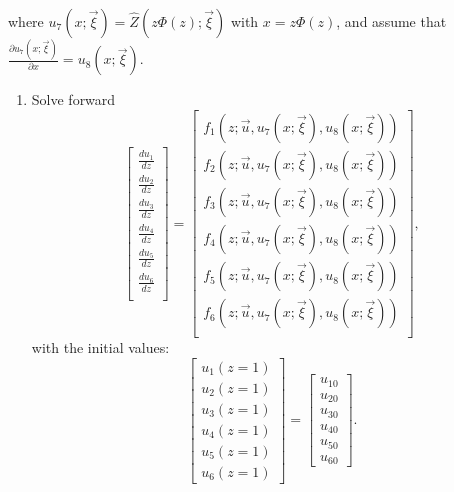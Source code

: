 \documentclass[11pt]{article}
\begin{document}
where ${u_7}\left( {x;\vec \xi  } \right) = \widehat Z\left( {z\Phi \left( z \right);\vec \xi  } \right)$ with $ x = z\Phi \left( z \right)$, and {\color{blue} assume that $ \frac{{\partial {u_7}\left( {x;\vec \xi } \right)}}{{\partial x}} = {u_8}\left( {x;\vec \xi } \right) $}. 

\begin{enumerate}
	\item  Solve forward 
		\begin{equation}
			\begin{bmatrix}
			\frac{{du_1}}{{dz}} \\
			\frac{{du_2}}{{dz}} \\
			\frac{{du_3}}{{dz}} \\
			\frac{{du_4}}{{dz}} \\
			\frac{{du_5}}{{dz}} \\
			\frac{{du_6}}{{dz}} \\
		    \end{bmatrix} = \begin{bmatrix}
				f_1\left( {z;\vec u,{u_7}\left( {x;\vec \xi } \right), {u_8}\left( {x;\vec \xi } \right) }\right)\\
				f_2\left( {z;\vec u,{u_7}\left( {x;\vec \xi } \right), {u_8}\left( {x;\vec \xi } \right) }\right)\\
				f_3\left( {z;\vec u,{u_7}\left( {x;\vec \xi } \right), {u_8}\left( {x;\vec \xi } \right) }\right)\\
				f_4\left( {z;\vec u,{u_7}\left( {x;\vec \xi } \right), {u_8}\left( {x;\vec \xi } \right) }\right)\\
				f_5\left( {z;\vec u,{u_7}\left( {x;\vec \xi } \right), {u_8}\left( {x;\vec \xi } \right) }\right)\\
				f_6\left( {z;\vec u,{u_7}\left( {x;\vec \xi } \right), {u_8}\left( {x;\vec \xi } \right) }\right) \\
			\end{bmatrix},
		\label{eq21}
	\end{equation}
	with the initial values:
	\begin{equation}
		\begin{bmatrix}
		u_1\left( {z = 1} \right) \\
		u_2\left( {z = 1} \right) \\
		u_3\left( {z = 1} \right) \\
		u_4\left( {z = 1} \right) \\
		u_5\left( {z = 1} \right) \\
		u_6\left( {z = 1} \right)
		\end{bmatrix} = \begin{bmatrix}
			u_{10} \\
			u_{20} \\
			u_{30} \\
			u_{40} \\
			u_{50} \\
			u_{60}
		\end{bmatrix}.
	\end{equation}
	

\end{enumerate}
\end{document}
